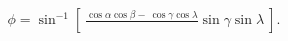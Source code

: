 \documentclass[preview]{standalone}
\begin{document}
\begin{align*}
\phi = \sin^{-1} \left[\
                            \frac{ \cos\alpha \cos\beta -\
                            \cos\gamma \cos\lambda }\
                            { \sin\gamma \sin\lambda }\
                            \right].
\end{align*}
\end{document}
